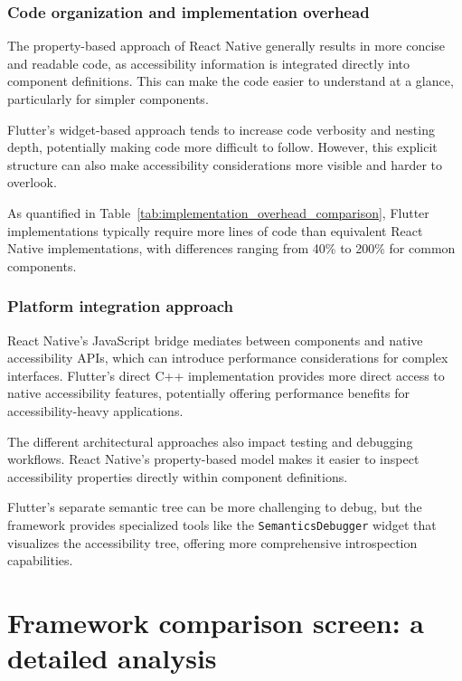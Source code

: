 \FloatBarrier

\subsubsection{Code organization and implementation overhead}

The property-based approach of React Native generally results in more concise and readable code, as accessibility information is integrated directly into component definitions. This can make the code easier to understand at a glance, particularly for simpler components.

Flutter's widget-based approach tends to increase code verbosity and nesting depth, potentially making code more difficult to follow. However, this explicit structure can also make accessibility considerations more visible and harder to overlook.

As quantified in Table~\ref{tab:implementation_overhead_comparison}, Flutter implementations typically require more lines of code than equivalent React Native implementations, with differences ranging from 40\% to 200\% for common components.

\subsubsection{Platform integration approach}

React Native's JavaScript bridge mediates between components and native accessibility APIs, which can introduce performance considerations for complex interfaces. Flutter's direct C++ implementation provides more direct access to native accessibility features, potentially offering performance benefits for accessibility-heavy applications.

The different architectural approaches also impact testing and debugging workflows. React Native's property-based model makes it easier to inspect accessibility properties directly within component definitions.

Flutter's separate semantic tree can be more challenging to debug, but the framework provides specialized tools like the \texttt{SemanticsDebugger} widget that visualizes the accessibility tree, offering more comprehensive introspection capabilities.

\section{Framework comparison screen: a detailed analysis}
\label{subsec:implementation-framework-comparison-screen}

